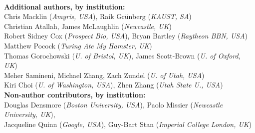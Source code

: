 \documentclass[finalspec]{sbmlpkgspec}
\begin{document}
{\\
{\bf Additional authors, by institution:}\\
Chris Macklin (\emph{Amyris, USA}), Raik Gr\"unberg (\emph{KAUST, SA}) \\
Christian Atallah, James McLaughlin (\emph{Newcastle, UK})\\ 
Robert Sidney Cox (\emph{Prospect Bio, USA}), Bryan Bartley (\emph{Raytheon BBN, USA}) \\
Matthew Pocock (\emph{Turing Ate My Hamster, UK}) \\
Thomas Gorochowski (\emph{U. of Bristol, UK}), James Scott-Brown (\emph{U. of Oxford, UK})\\
Meher Samineni, Michael Zhang, Zach Zundel (\emph{U. of Utah, USA})\\
Kiri Choi (\emph{U. of Washington, USA}), Zhen Zhang (\emph{Utah State U., USA})\\
{\bf Non-author contributors, by institution:}\\
Douglas Densmore (\emph{Boston University, USA}), Paolo Missier (\emph{Newcastle University, UK}), \\
Jacqueline Quinn (\emph{Google, USA}), Guy-Bart Stan (\emph{Imperial College London, UK})
}
\end{document}
